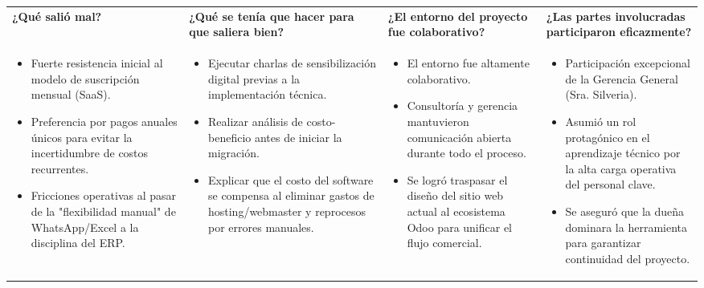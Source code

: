 \documentclass[11pt]{article}
\begin{document}
\begin{longtable}{|p{3.8cm}|p{3.8cm}|p{3.8cm}|p{3.8cm}|}
\hline
\rowcolor{RoundGray}\multicolumn{4}{|l|}{\textbf{Segunda Ronda}} \\ \hline
\rowcolor{HeaderGray}\textbf{¿Qué salió mal?} & \textbf{¿Qué se tenía que hacer para que saliera bien?} & \textbf{¿El entorno del proyecto fue colaborativo?} & \textbf{¿Las partes involucradas participaron eficazmente?} \\ \hline
\begin{itemize}[leftmargin=*,nosep]
    \item Fuerte resistencia inicial al modelo de suscripción mensual (SaaS).
    \item Preferencia por pagos anuales únicos para evitar la incertidumbre de costos recurrentes.
    \item Fricciones operativas al pasar de la "flexibilidad manual" de WhatsApp/Excel a la disciplina del ERP.
\end{itemize} &
\begin{itemize}[leftmargin=*,nosep]
    \item Ejecutar charlas de sensibilización digital previas a la implementación técnica.
    \item Realizar análisis de costo-beneficio antes de iniciar la migración.
    \item Explicar que el costo del software se compensa al eliminar gastos de hosting/webmaster y reprocesos por errores manuales.
\end{itemize} &
\begin{itemize}[leftmargin=*,nosep]
    \item El entorno fue altamente colaborativo.
    \item Consultoría y gerencia mantuvieron comunicación abierta durante todo el proceso.
    \item Se logró traspasar el diseño del sitio web actual al ecosistema Odoo para unificar el flujo comercial.
\end{itemize} &
\begin{itemize}[leftmargin=*,nosep]
    \item Participación excepcional de la Gerencia General (Sra. Silveria).
    \item Asumió un rol protagónico en el aprendizaje técnico por la alta carga operativa del personal clave.
    \item Se aseguró que la dueña dominara la herramienta para garantizar continuidad del proyecto.
\end{itemize} \\ \hline


\end{longtable}
\end{document}
